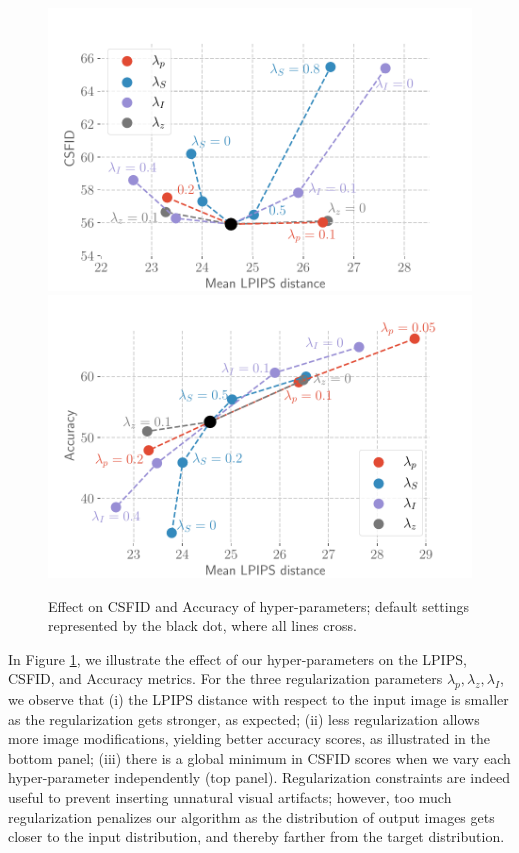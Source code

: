 \begin{figure}
    \centering
    \vspace{-2em}
    \includegraphics[width=\linewidth]{images/flexit/assets/hparam_fig.pdf}
    \includegraphics[width=\linewidth]{images/flexit/assets/hparam_acc.pdf}
    \caption{
    Effect  on CSFID and Accuracy of hyper-parameters;  default settings  represented by 
    the black dot, where all lines cross.
    }
    
    \label{fig:hparam_csfid}
    \vspace{-1em}
\end{figure}


In Figure \ref{fig:hparam_csfid}, we illustrate the effect of our hyper-parameters on
 the LPIPS, CSFID, and Accuracy metrics. 
For the three regularization parameters $\lambda_p, \lambda_z, \lambda_I$, we observe
 that
(i) the LPIPS distance with respect to the input image is smaller as the regularization 
gets stronger, as expected; 
(ii) less regularization allows more image modifications, yielding better accuracy
 scores, as illustrated in the bottom panel; 
(iii) there is a global minimum in CSFID scores when we vary each hyper-parameter 
 independently (top panel). Regularization constraints are indeed useful to prevent
  inserting unnatural visual artifacts; however, too much regularization penalizes our 
  algorithm as the distribution of output images gets closer to the input distribution, 
  and thereby farther from the  target distribution.

